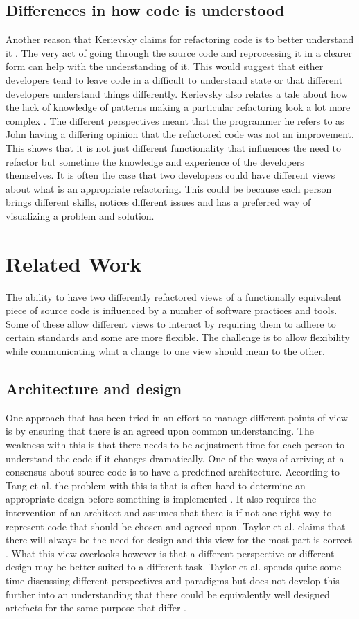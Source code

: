 \documentclass[12pt]{CRPITStyle}
\renewcommand{\cite}{\citep}
\begin{document}
\subsection{Differences in how code is understood}
Another reason that Kerievsky claims for refactoring code is to better understand it \cite{Kerievsky2004}. The very act of going through the source code and reprocessing it in a clearer form can help with the understanding of it. This would suggest that either developers tend to leave code in a difficult to understand state or that different developers understand things differently.
Kerievsky also relates a tale about how the lack of knowledge of patterns making a particular refactoring look a lot more complex \cite{Kerievsky2004}. The different perspectives meant that the programmer he refers to as John having a differing opinion that the refactored code was not an improvement. This shows that it is not just different functionality that influences the need to refactor but sometime the knowledge and experience of the developers themselves. It is often the case that two developers could have different views about what is an appropriate refactoring. This could be because each person brings different skills, notices different issues and has a preferred way of visualizing a problem and solution.

\section{Related Work}
The ability to have two differently refactored views of a functionally equivalent piece of source code is influenced by a number of software practices and tools. Some of these allow different views to interact by requiring them to adhere to certain standards and some are more flexible. The challenge is to allow flexibility while communicating what a change to one view should mean to the other. 

\subsection{Architecture and design}
One approach that has been tried in an effort to manage different points of view is by ensuring that there is an agreed upon common understanding. The weakness with this is that there needs to be adjustment time for each person to understand the code if it changes dramatically. 
One of the ways of arriving at a consensus about source code is to have a predefined architecture. According to Tang et al. the problem with this is that is often hard to determine an appropriate design before something is implemented \cite{Tang2009}. It also requires the intervention of an architect and assumes that there is if not one right way to represent code that should be chosen and agreed upon. Taylor et al. claims that there will always be the need for design and this view for the most part is correct \cite{Taylor2007}. What this view overlooks however is that a different perspective or different design may be better suited to a different task. Taylor et al. spends quite some time discussing different perspectives and paradigms but does not develop this further into an understanding that there could be equivalently well designed artefacts for the same purpose that differ \cite{Taylor2007}.
\end{document}
